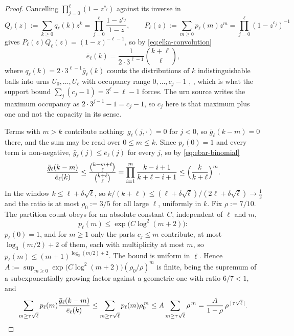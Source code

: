 \documentclass[11pt]{article}
\theoremstyle{definition}
\theoremstyle{remark}
\begin{document}
\begin{proof}
Cancelling $\prod_{j=0}^\ell(1-z^{c_j})$ against its inverse in
\[
 Q_\ell(z):=\sum_{k\ge0}q_\ell(k)z^k
 =\prod_{j=0}^\ell\frac{1-z^{c_j}}{1-z},\qquad
 P_\ell(z):=\sum_{m\ge0}p_\ell(m)z^m
 =\prod_{j=0}^\ell(1-z^{c_j})^{-1}
\]
gives $P_\ell(z)Q_\ell(z)=(1-z)^{-\ell-1}$, so by \eqref{eq:elka-convolution}
\begin{equation}\label{eq:ebar-binomial}
 \bar e_\ell(k)=\frac{1}{2\cdot3^{\ell-1}}\binom{k+\ell}{\ell},
\end{equation}
where $q_\ell(k)=2\cdot3^{\ell-1}\bar g_\ell(k)$ counts the
distributions of $k$ indistinguishable balls into urns
$U_0,\ldots,U_\ell$ with occupancy range $0,\ldots,c_j-1$
\cite[\S2]{Wirsching2003}, \cite[p.~980]{Wirsching1998Urns}, which is
what the support bound $\sum_j(c_j-1)=3^\ell-\ell-1$ forces. The urn
source writes the maximum occupancy as $2\cdot3^{j-1}-1=c_j-1$, so
$c_j$ here is that maximum plus one and not the capacity in its sense.

Terms with $m>k$ contribute nothing: $g_\ell(j,\cdot)=0$ for $j<0$, so
$\bar g_\ell(k-m)=0$ there, and the sum may be read over
$0\le m\le k$. Since $p_\ell(0)=1$ and every term is non-negative,
$\bar g_\ell(j)\le\bar e_\ell(j)$ for every $j$, so by
\eqref{eq:ebar-binomial}
\[
 \frac{\bar g_\ell(k-m)}{\bar e_\ell(k)}
 \le\frac{\binom{k-m+\ell}{\ell}}{\binom{k+\ell}{\ell}}
 =\prod_{i=1}^{m}\frac{k-i+1}{k+\ell-i+1}
 \le\Bigl(\frac{k}{k+\ell}\Bigr)^{m}.
\]
In the window $k\le\ell+\delta\sqrt\ell$, so
$k/(k+\ell)\le(\ell+\delta\sqrt\ell)/(2\ell+\delta\sqrt\ell)\to\tfrac12$
and the ratio is at most $\rho_0:=3/5$ for all large $\ell$, uniformly
in $k$. Fix $\rho:=7/10$. The partition count obeys
for an absolute constant $C$, independent of $\ell$ and $m$,
\begin{equation}\label{eq:partition-bound}
 p_\ell(m)\le\exp\bigl(C\log^2(m+2)\bigr):
\end{equation}
$p_\ell(0)=1$, and for $m\ge1$ only the parts $c_j\le m$ contribute, at
most $\log_3(m/2)+2$ of them, each with multiplicity at most $m$, so
$p_\ell(m)\le(m+1)^{\log_3(m/2)+2}$. The bound is uniform in $\ell$.
Hence $A:=\sup_{m\ge0}\exp\bigl(C\log^2(m+2)\bigr)(\rho_0/\rho)^m$ is
finite, being the supremum of a subexponentially growing factor against
a geometric one with ratio $6/7<1$, and
\[
 \sum_{m\ge\tau\sqrt\ell}p_\ell(m)\frac{\bar g_\ell(k-m)}{\bar e_\ell(k)}
 \le\sum_{m\ge\tau\sqrt\ell}p_\ell(m)\rho_0^{\,m}
 \le A\sum_{m\ge\tau\sqrt\ell}\rho^{\,m}
 =\frac{A}{1-\rho}\,\rho^{\,\lceil\tau\sqrt\ell\rceil}. \qedhere
\]
\end{proof}
\end{document}

